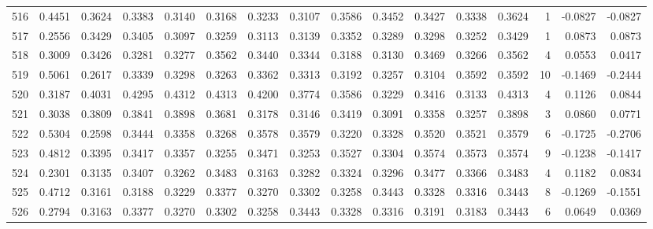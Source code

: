 \begin{tabular}{lrrrrrrrrrrrrrrr}
516 &      0.4451 &  0.3624 &  0.3383 &  0.3140 &  0.3168 &  0.3233 &  0.3107 &  0.3586 &  0.3452 &  0.3427 &   0.3338 &     0.3624 &      1 &                   -0.0827 &                    -0.0827 \\
517 &      0.2556 &  0.3429 &  0.3405 &  0.3097 &  0.3259 &  0.3113 &  0.3139 &  0.3352 &  0.3289 &  0.3298 &   0.3252 &     0.3429 &      1 &                    0.0873 &                     0.0873 \\
518 &      0.3009 &  0.3426 &  0.3281 &  0.3277 &  0.3562 &  0.3440 &  0.3344 &  0.3188 &  0.3130 &  0.3469 &   0.3266 &     0.3562 &      4 &                    0.0553 &                     0.0417 \\
519 &      0.5061 &  0.2617 &  0.3339 &  0.3298 &  0.3263 &  0.3362 &  0.3313 &  0.3192 &  0.3257 &  0.3104 &   0.3592 &     0.3592 &     10 &                   -0.1469 &                    -0.2444 \\
520 &      0.3187 &  0.4031 &  0.4295 &  0.4312 &  0.4313 &  0.4200 &  0.3774 &  0.3586 &  0.3229 &  0.3416 &   0.3133 &     0.4313 &      4 &                    0.1126 &                     0.0844 \\
521 &      0.3038 &  0.3809 &  0.3841 &  0.3898 &  0.3681 &  0.3178 &  0.3146 &  0.3419 &  0.3091 &  0.3358 &   0.3257 &     0.3898 &      3 &                    0.0860 &                     0.0771 \\
522 &      0.5304 &  0.2598 &  0.3444 &  0.3358 &  0.3268 &  0.3578 &  0.3579 &  0.3220 &  0.3328 &  0.3520 &   0.3521 &     0.3579 &      6 &                   -0.1725 &                    -0.2706 \\
523 &      0.4812 &  0.3395 &  0.3417 &  0.3357 &  0.3255 &  0.3471 &  0.3253 &  0.3527 &  0.3304 &  0.3574 &   0.3573 &     0.3574 &      9 &                   -0.1238 &                    -0.1417 \\
524 &      0.2301 &  0.3135 &  0.3407 &  0.3262 &  0.3483 &  0.3163 &  0.3282 &  0.3324 &  0.3296 &  0.3477 &   0.3366 &     0.3483 &      4 &                    0.1182 &                     0.0834 \\
525 &      0.4712 &  0.3161 &  0.3188 &  0.3229 &  0.3377 &  0.3270 &  0.3302 &  0.3258 &  0.3443 &  0.3328 &   0.3316 &     0.3443 &      8 &                   -0.1269 &                    -0.1551 \\
526 &      0.2794 &  0.3163 &  0.3377 &  0.3270 &  0.3302 &  0.3258 &  0.3443 &  0.3328 &  0.3316 &  0.3191 &   0.3183 &     0.3443 &      6 &                    0.0649 &                     0.0369 \\

\end{tabular}
